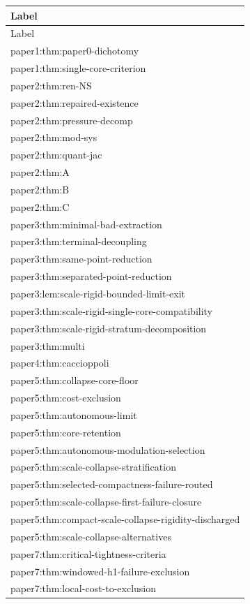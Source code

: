 \documentclass[11pt]{amsart}
\begin{document}
\begin{longtable}{@{}>{\ttfamily\footnotesize\raggedright\arraybackslash}p{}@{}}
\toprule
Label\\
\midrule
\endfirsthead
\toprule
Label\\
\midrule
\endhead
paper1:thm:paper0-dichotomy\\
paper1:thm:single-core-criterion\\
paper2:thm:ren-NS\\
paper2:thm:repaired-existence\\
paper2:thm:pressure-decomp\\
paper2:thm:mod-sys\\
paper2:thm:quant-jac\\
paper2:thm:A\\
paper2:thm:B\\
paper2:thm:C\\
paper3:thm:minimal-bad-extraction\\
paper3:thm:terminal-decoupling\\
paper3:thm:same-point-reduction\\
paper3:thm:separated-point-reduction\\
paper3:lem:scale-rigid-bounded-limit-exit\\
paper3:thm:scale-rigid-single-core-compatibility\\
paper3:thm:scale-rigid-stratum-decomposition\\
paper3:thm:multi\\
paper4:thm:caccioppoli\\
paper5:thm:collapse-core-floor\\
paper5:thm:cost-exclusion\\
paper5:thm:autonomous-limit\\
paper5:thm:core-retention\\
paper5:thm:autonomous-modulation-selection\\
paper5:thm:scale-collapse-stratification\\
paper5:thm:selected-compactness-failure-routed\\
paper5:thm:scale-collapse-first-failure-closure\\
paper5:thm:compact-scale-collapse-rigidity-discharged\\
paper5:thm:scale-collapse-alternatives\\
paper7:thm:critical-tightness-criteria\\
paper7:thm:windowed-h1-failure-exclusion\\
paper7:thm:local-cost-to-exclusion\\

\end{longtable}
\end{document}

